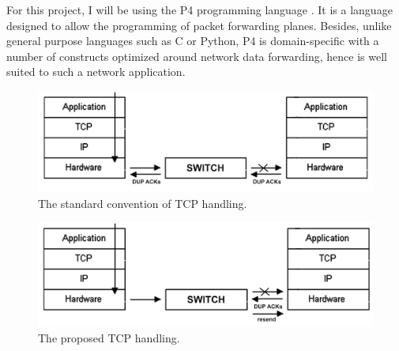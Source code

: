 For this project, I will be using the P4 programming language \cite{p4.org}. It is a language designed to allow the programming of packet forwarding planes. Besides, unlike general purpose languages such as C or Python, P4 is domain-specific with a number of constructs optimized around network data forwarding, hence is well suited to such a network application. 

\vspace*{5mm}

 \begin{figure}[h]
	\centering
	\includegraphics[width=\textwidth]{../Proposal/Figs/tradition-tcp.png}
	\caption{The standard convention of TCP handling.}
	\label{tradition-tcp}
\end{figure}

\begin{figure}[h]
	\centering
	\includegraphics[width=\textwidth]{../Proposal/Figs/project-tcp.png}
	\caption{The proposed TCP handling.}
	\label{project-tcp}
\end{figure}